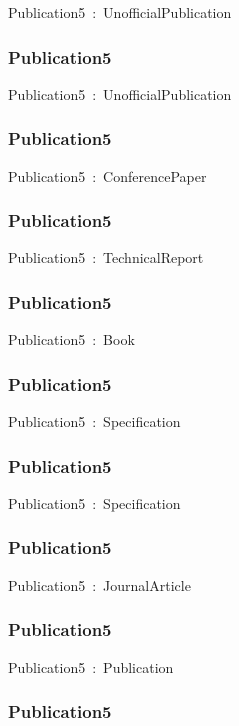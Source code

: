 \documentclass{article}
\begin{document}
Publication5~:~UnofficialPublication

\subsubsection*{Publication5}

Publication5~:~UnofficialPublication

\subsubsection*{Publication5}

Publication5~:~ConferencePaper

\subsubsection*{Publication5}

Publication5~:~TechnicalReport

\subsubsection*{Publication5}

Publication5~:~Book

\subsubsection*{Publication5}

Publication5~:~Specification

\subsubsection*{Publication5}

Publication5~:~Specification

\subsubsection*{Publication5}

Publication5~:~JournalArticle

\subsubsection*{Publication5}

Publication5~:~Publication

\subsubsection*{Publication5}
\end{document}
